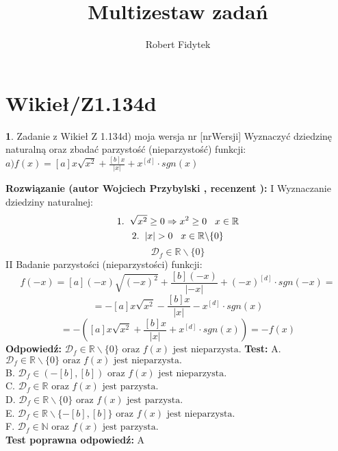 \documentclass[12pt, a4paper]{article}
\title{Multizestaw zadań}
\author{Robert Fidytek}
\date{}
\theoremstyle{definition} %
\newtheorem{zad}{}
\newcommand{\kategoria}[1]{\section{#1}} %
\newcommand{\zadStart}[1]{\begin{zad}#1\newline} %
\newcommand{\zadStop}{\end{zad}}   %
\newcommand{\rozwStart}[2]{\noindent \textbf{Rozwiązanie (autor #1 , recenzent #2): }\newline} %
\newcommand{\rozwStop}{\newline}                                            %
\newcommand{\odpStart}{\noindent \textbf{Odpowiedź:}\newline}    %
\newcommand{\odpStop}{\newline}                                             %
\newcommand{\testStart}{\noindent \textbf{Test:}\newline} %
\newcommand{\testStop}{\newline} %
\newcommand{\kluczStart}{\noindent \textbf{Test poprawna odpowiedź:}\newline} %
\newcommand{\kluczStop}{\newline} %
\begin{document}
\maketitle


\kategoria{Wikieł/Z1.134d}
\zadStart{Zadanie z Wikieł Z 1.134d) moja wersja nr [nrWersji]}
Wyznaczyć dziedzinę naturalną oraz zbadać parzystość (nieparzystość) funkcji:\\
$a) f(x)=[a]x\sqrt{x^{2}}+\frac{[b]x}{|x|}+x^{[d]}\cdot sgn(x)$
\zadStop
\rozwStart{Wojciech Przybylski}{}
I Wyznaczanie dziedziny naturalnej:\\
$$1.\hspace{2mm}\sqrt{x^{2}}\geq0 \Rightarrow x^{2}\geq0 \hspace{3mm} x\in\mathbb{R}$$
$$2.\hspace{2mm}|x|>0 \hspace{3mm} x\in\mathbb{R}\backslash\{0\}$$
$$\mathcal{D}_{f}\in\mathbb{R}\backslash\{0\}$$
II Badanie parzystości (nieparzystości) funkcji:
$$f(-x)=[a](-x)\sqrt{(-x)^{2}}+\frac{[b](-x)}{|-x|}+(-x)^{[d]}\cdot sgn(-x)=$$
$$=-[a]x\sqrt{x^{2}}-\frac{[b]x}{|x|}-x^{[d]}\cdot sgn(x)$$
$$=-([a]x\sqrt{x^{2}}+\frac{[b]x}{|x|}+x^{[d]}\cdot sgn(x))=-f(x)$$
\rozwStop
\odpStart
$\mathcal{D}_{f}\in\mathbb{R}\backslash\{0\} \mbox{ oraz } f(x)\mbox{ jest nieparzysta.}$ 
\odpStop
\testStart
A. $\mathcal{D}_{f}\in\mathbb{R}\backslash\{0\} \mbox{ oraz } f(x)\mbox{ jest nieparzysta.}$  \\
B. $\mathcal{D}_{f}\in (-[b],[b]) \mbox{ oraz } f(x)\mbox{ jest nieparzysta.}$ \\
C. $\mathcal{D}_{f}\in \mathbb{R} \mbox{ oraz } f(x)\mbox{ jest parzysta.}$ \\
D. $\mathcal{D}_{f}\in \mathbb{R}\backslash\{0\} \mbox{ oraz } f(x)\mbox{ jest parzysta.}$ \\
E. $\mathcal{D}_{f}\in \mathbb{R}{\backslash}\{-[b],[b]\} \mbox{ oraz } f(x)\mbox{ jest nieparzysta.}$ \\
F. $\mathcal{D}_{f}\in \mathbb{N} \mbox{ oraz } f(x)\mbox{ jest parzysta.}$ \\
\testStop
\kluczStart
A
\kluczStop
\end{document}
